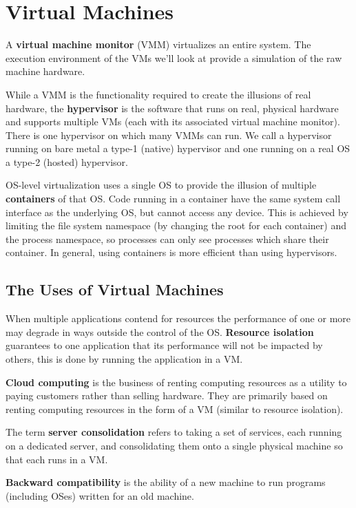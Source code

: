 \section{Virtual Machines}

A \textbf{virtual machine monitor} (VMM) virtualizes an entire system. The execution environment of the VMs we’ll look at provide a simulation of the raw machine hardware.\medskip

While a VMM is the functionality required to create the illusions of real hardware, the \textbf{hypervisor} is the software that runs on real, physical hardware and supports multiple VMs (each with its associated virtual machine monitor). There is one hypervisor on which many VMMs can run. We call a hypervisor running on bare metal a type-1 (native) hypervisor and one running on a real OS a type-2 (hosted) hypervisor. \medskip

OS-level virtualization uses a single OS to provide the illusion of multiple \textbf{containers} of that OS. Code running in a container have the same system call interface as the underlying OS, but cannot access any device. This is achieved by limiting the file system namespace (by changing the root for each container) and the process namespace, so processes can only see processes which share their container. In general, using containers is more efficient than using hypervisors.


\subsection{The Uses of Virtual Machines}

When multiple applications contend for resources the performance of one or more may degrade in ways outside the control of the OS. \textbf{Resource isolation} guarantees to one application that its performance will not be impacted by others, this is done by running the application in a VM. \medskip

\textbf{Cloud computing} is the business of renting computing resources as a utility to paying customers rather than selling hardware. They are primarily based on renting computing resources in the form of a VM (similar to resource isolation).

The term \textbf{server consolidation} refers to taking a set of services, each running on a dedicated server, and consolidating them onto a single physical machine so that each runs in a VM. \medskip

\textbf{Backward compatibility} is the ability of a new machine to run programs (including OSes) written for an old machine. \medskip


